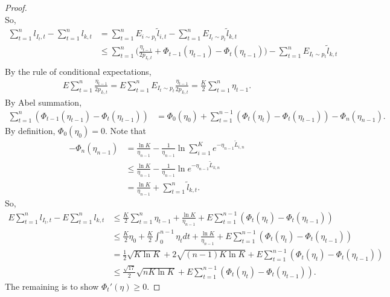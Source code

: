 \begin{proof}
\begin{equation}
    \end{equation}
    So,
    \begin{align}
        \sum_{t=1}^n l_{I_t, t} - \sum_{t=1}^n l_{k,t}
            &= \sum_{t=1}^n E_{i\sim p_t}\tilde l_{i,t} - \sum_{t=1}^n E_{I_t\sim p_t}\tilde l_{k,t} \\
            &\le \sum_{t=1}^n \bigg(\frac{\eta_{t-1}}{2p_{I_t,t}} + \Phi_{t-1}(\eta_{t-1}) - \Phi_t(\eta_{t-1})\bigg)
                - \sum_{t=1}^n E_{I_t\sim p_t}\tilde l_{k,t} \\
    \end{align}
    By the rule of conditional expectations,
    \begin{align}
        E\sum_{t=1}^n \frac{\eta_{t-1}}{2p_{I_t,t}}
            = E\sum_{t=1}^n E_{I_t\sim p_t}\frac{\eta_{t-1}}{2p_{I_t,t}}
            = \frac{K}{2}\sum_{t=1}^n\eta_{t-1}.
    \end{align}
    By Abel summation,
    \begin{align}
        \sum_{t=1}^n ( \Phi_{t-1}(\eta_{t-1}) - \Phi_t(\eta_{t-1}))
            &= \Phi_0(\eta_0) + \sum_{t=1}^{n-1} ( \Phi_t(\eta_t) - \Phi_t(\eta_{t-1})) -\Phi_n(\eta_{n-1}).
    \end{align}
    By definition, $\Phi_0(\eta_0)=0$. Note that
    \begin{align}
        -\Phi_n(\eta_{n-1})
            &= \frac{\ln K}{\eta_{n-1}} - \frac{1}{\eta_{n-1}}\ln \sum_{i=1}^K e^{-\eta_{n-1}\tilde L_{i,n}} \\
            &\le \frac{\ln K}{\eta_{n-1}} - \frac{1}{\eta_{n-1}}\ln e^{-\eta_{n-1}\tilde L_{k,n}} \\
            &= \frac{\ln K}{\eta_{n-1}} + \sum_{t=1}^n \tilde l_{k,t}.
    \end{align}
    So,
    \begin{align}
        E\sum_{t=1}^n l_{I_t, t} - E\sum_{t=1}^n l_{k,t}
            &\le \frac{K}{2}\sum_{t=1}^n\eta_{t-1} + \frac{\ln K}{\eta_{n-1}}
                + E\sum_{t=1}^{n-1} ( \Phi_t(\eta_t) - \Phi_t(\eta_{t-1})) \\
            &\le  \frac{K}{2}\eta_0 + \frac{K}{2} \int_0^{n-1}\eta_t dt + \frac{\ln K}{\eta_{n-1}}
                + E\sum_{t=1}^{n-1} ( \Phi_t(\eta_t) - \Phi_t(\eta_{t-1})) \\
            &= \frac{1}{2}\sqrt{K\ln K} + 2\sqrt{(n-1)K\ln K}
                + E\sum_{t=1}^{n-1} ( \Phi_t(\eta_t) - \Phi_t(\eta_{t-1})) \\
            &\le \frac{\sqrt{17}}{2}\sqrt{nK\ln K}
                + E\sum_{t=1}^{n-1} ( \Phi_t(\eta_t) - \Phi_t(\eta_{t-1})).
    \end{align}
    The remaining is to show $\Phi_t'(\eta)\ge0$.
\end{proof}

